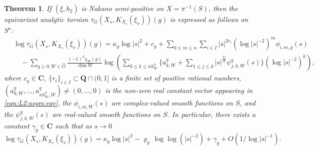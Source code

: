 \documentclass[amscd, leqno]{amsart}
\theoremstyle{plain}
\newtheorem{theorem}{Theorem}[section]
\theoremstyle{definition}
\theoremstyle{remark}
\begin{document}
\begin{theorem}
\label{thm:main:1}
If $(\xi,h_{\xi})$ is Nakano semi-positive on $X=\pi^{-1}(S)$, then the equivariant analytic torsion $\tau_{G}(X_{s},K_{X_{s}}(\xi_{s}))(g)$ 
is expressed as follows on $S^{o}$:
\begin{equation}
\label{eqn:reg:tors}
\begin{aligned}
\,&
\log \tau_{G}(X_{s},K_{X_{s}}(\xi_{s}))(g) = 
\kappa_{g} \log |s|^{2} + c_{g} + \sum_{0\leq m \leq n}\sum_{i\in I} |s|^{2r_{i}} (\log |s|^{-2})^{m} \phi_{i,m,g}(s)
\\
&\quad - \sum_{q\geq0, W \in \widehat{G}} \frac{(-1)^{q}\chi_{W}(g)}{\dim W} 
\log \left( \sum_{0 \leq k \leq n h_{W}^{q}} \{ a_{k,W}^{q} + \sum_{1 \leq j \leq d} |s|^{\frac{2j}{d}} \psi_{j,k,W}^{q}(s) \} (\log |s|^{-2})^{k} \right),
\end{aligned}
\end{equation}
where $c_{g} \in {\mathbf C}$, $\{ r_{i} \}_{i \in I} \subset {\mathbf Q}\cap (0,1]$ is a finite set of positive rational numbers,
$(a_{0,W}^{q}, \ldots, a_{n h_{W}^{q},W}^{q}) \not= (0,\ldots,0)$ is the non-zero real constant vector 
appearing in \eqref{eqn:L2:asym:eqv}, the $\phi_{i,m,W}(s)$ are complex-valued smooth functions on $S$, 
and the $\psi_{j,k,W}^{q}(s)$ are real-valued smooth functions on $S$. 
In particular, there exists a constant $\gamma_{g}\in{\mathbf C}$ such that as $s\to0$
\begin{equation}
\label{eqn:asymp:eq:tors}
\log \tau_{G}(X_{s},K_{X_{s}}(\xi_{s}))(g) = \kappa_{g} \log |s|^{2} - \varrho_{g}\,\log\log( |s|^{-2}) + \gamma_{g} + O\left(1/\log |s|^{-1} \right).
\end{equation}
\end{theorem}
\end{document}
